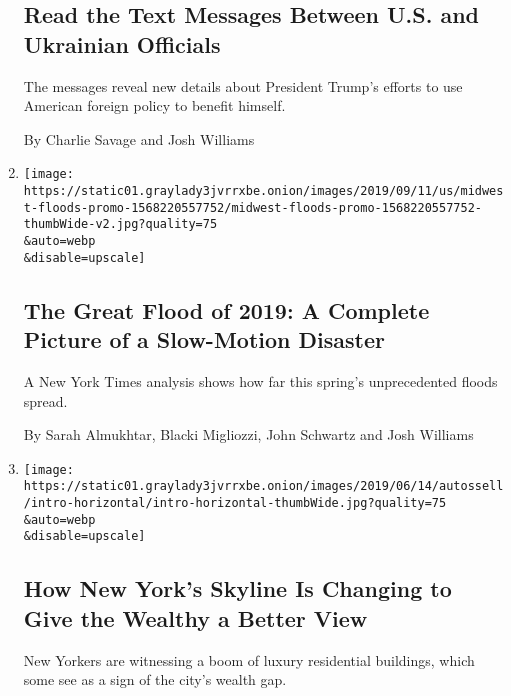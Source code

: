\begin{enumerate}
  \hypertarget{read-the-text-messages-between-us-and-ukrainian-officials}{%
  \subsection{Read the Text Messages Between U.S. and Ukrainian
  Officials}\label{read-the-text-messages-between-us-and-ukrainian-officials}}

  The messages reveal new details about President Trump's efforts to use
  American foreign policy to benefit himself.

  By Charlie Savage and Josh Williams
\item
  \href{/interactive/2019/09/11/us/midwest-flooding.html}{}

  \texttt{[image: https://static01.graylady3jvrrxbe.onion/images/2019/09/11/us/midwest-floods-promo-1568220557752/midwest-floods-promo-1568220557752-thumbWide-v2.jpg?quality=75\\\&auto=webp\\\&disable=upscale]}

  \hypertarget{the-great-flood-of-2019-a-complete-picture-of-a-slow-motion-disaster}{%
  \subsection{The Great Flood of 2019: A Complete Picture of a
  Slow-Motion
  Disaster}\label{the-great-flood-of-2019-a-complete-picture-of-a-slow-motion-disaster}}

  A New York Times analysis shows how far this spring's unprecedented
  floods spread.

  By Sarah Almukhtar, Blacki Migliozzi, John Schwartz and Josh Williams
\item
  \href{/interactive/2019/06/14/nyregion/new-york-skyline-inequality.html}{}

  \texttt{[image: https://static01.graylady3jvrrxbe.onion/images/2019/06/14/autossell/intro-horizontal/intro-horizontal-thumbWide.jpg?quality=75\\\&auto=webp\\\&disable=upscale]}

  \hypertarget{how-new-yorks-skyline-is-changing-to-give-the-wealthy-a-better-view}{%
  \subsection{How New York's Skyline Is Changing to Give the Wealthy a
  Better
  View}\label{how-new-yorks-skyline-is-changing-to-give-the-wealthy-a-better-view}}

  New Yorkers are witnessing a boom of luxury residential buildings,
  which some see as a sign of the city's wealth gap.


\end{enumerate}
